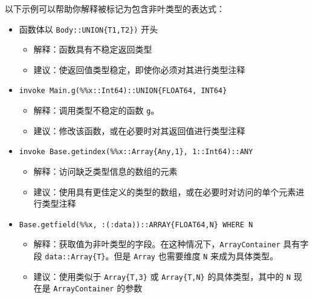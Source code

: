 以下示例可以帮助你解释被标记为包含非叶类型的表达式：



\begin{itemize}
\item 函数体以 \texttt{Body::UNION\{T1,T2\})} 开头

\begin{itemize}
\item 解释：函数具有不稳定返回类型


\item 建议：使返回值类型稳定，即使你必须对其进行类型注释

\end{itemize}

\item \texttt{invoke Main.g(\%\%x::Int64)::UNION\{FLOAT64, INT64\}}

\begin{itemize}
\item 解释：调用类型不稳定的函数 \texttt{g}。


\item 建议：修改该函数，或在必要时对其返回值进行类型注释

\end{itemize}

\item \texttt{invoke Base.getindex(\%\%x::Array\{Any,1\}, 1::Int64)::ANY}

\begin{itemize}
\item 解释：访问缺乏类型信息的数组的元素


\item 建议：使用具有更佳定义的类型的数组，或在必要时对访问的单个元素进行类型注释

\end{itemize}

\item \texttt{Base.getfield(\%\%x, :(:data))::ARRAY\{FLOAT64,N\} WHERE N}

\begin{itemize}
\item 解释：获取值为非叶类型的字段。在这种情况下，\texttt{ArrayContainer} 具有字段 \texttt{data::Array\{T\}}。但是 \texttt{Array} 也需要维度 \texttt{N} 来成为具体类型。


\item 建议：使用类似于 \texttt{Array\{T,3\}} 或 \texttt{Array\{T,N\}} 的具体类型，其中的 \texttt{N} 现在是 \texttt{ArrayContainer} 的参数

\end{itemize}
\end{itemize}


